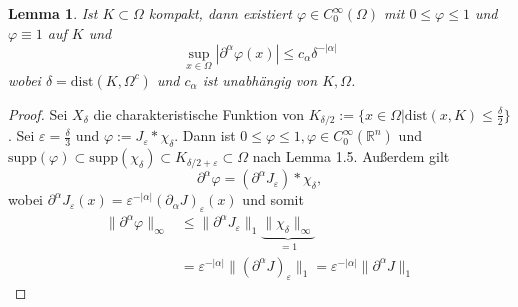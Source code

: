 \documentclass[
paper=a4,
bibtotocnumbered,
liststotocnumbered,
tablecaptionabove,
pointlessnumbers,
twoside,
openright,
10pt
]
{report}
\newcommand{\dist}{\mathrm{dist}}
\let\phi\varphi
\newtheorem{lem}[thm]{Lemma}
\theoremstyle{definition}
\numberwithin{equation}{chapter}
\begin{document}
\begin{lem}\label{2.4}
Ist $K\subset \Omega$ kompakt, dann existiert $\phi \in C_0^\infty(\Omega)$ mit $0\le \phi \le 1$ und $\phi \equiv 1$ auf $K$ und
$$
\sup_{x\in \Omega} |\partial^\alpha \phi(x)|\le c_\alpha \delta^{-|\alpha|}
$$ 
wobei $\delta = \dist(K, \Omega^c)$ und $c_\alpha$ ist unabhängig von $K, \Omega$.
\end{lem}
\begin{proof}
Sei $X_\delta$ die charakteristische Funktion von $K_{\delta/2}:= \{x\in \Omega|\text{dist} (x,K) \le \frac{\delta}{2}\}$. Sei $\varepsilon = \frac{\delta}{3}$ und $\phi:= J_\varepsilon * \chi_\delta$. Dann ist $0 \le \phi \le 1, \phi \in C_0^\infty(\mathbb R^n)$ und $\text{supp}(\phi) \subset \text{supp}(\chi_\delta) \subset K_{\delta/2+ \varepsilon} \subset \Omega$ nach Lemma 1.5. Außerdem gilt
$$
\partial^\alpha \phi = (\partial^\alpha J_\varepsilon) * \chi_\delta,
$$ 
wobei $\partial^\alpha J_\varepsilon(x) = \varepsilon^{-|\alpha|} (\partial_\alpha J)_\varepsilon (x)$ und somit
\begin{align*}
\|\partial^\alpha \phi\|_\infty &\le \| \partial^\alpha J_\varepsilon \|_1 \underbrace{\| \chi_\delta\|_\infty}_{=1} \\
&= \varepsilon^{-|\alpha|} \| (\partial^\alpha J)_\varepsilon\|_1 = \varepsilon^{-|\alpha|} \| \partial^\alpha J\|_1
\end{align*} 
\end{proof}
\end{document}
